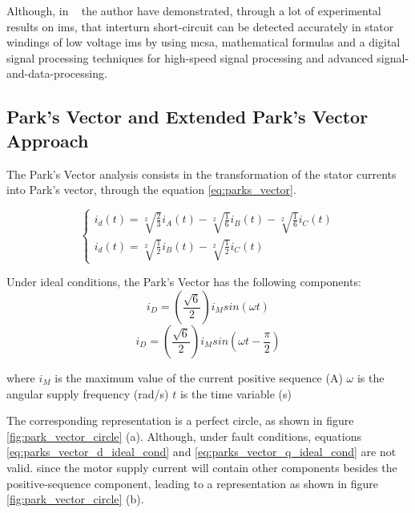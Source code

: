 Although, in ~\cite{Jung2006} the author have demonstrated, through a lot of experimental results on \acrshort{ims}, that interturn short-circuit can be detected accurately in stator windings of low voltage \acrshort{ims} by using \acrshort{mcsa}, mathematical formulas and a digital signal processing techniques for high-speed signal processing and advanced signal-and-data-processing.


\subsection{Park's Vector and Extended Park's Vector Approach} %
\label{subsec:epva}

The Park's Vector analysis consists in the transformation of the stator currents into Park's vector, through the equation \ref{eq:parks_vector}.

\begin{equation} \label{eq:parks_vector}
    \begin{cases}
	    i_{d}(t) =  \sqrt[2]{\frac{2}{3}} i_A(t) - \sqrt[2]{\frac{1}{6}} i_B(t) - \sqrt[2]{\frac{1}{6}} i_C(t) \\
	    i_{d}(t) =  \sqrt[2]{\frac{1}{2}} i_B(t) - \sqrt[2]{\frac{1}{2}} i_C(t) 
	\end{cases}
\end{equation}

 Under ideal conditions, the Park's Vector has the following components:
\begin{equation} \label{eq:parks_vector_d_ideal_cond}
    i_D = (\frac{\sqrt{6}}{2})i_M sin(\omega t)
\end{equation}
\begin{equation} \label{eq:parks_vector_q_ideal_cond}
    i_D = (\frac{\sqrt{6}}{2})i_M sin(\omega t - \frac{\pi}{2})
\end{equation}
 
where
    $i_M$ is the maximum value of the current positive sequence (A)
    $\omega$ is the angular supply frequency (rad/s)
    $t$ is the time variable (s)

The corresponding representation is a perfect circle, as shown in figure \ref{fig:park_vector_circle} (a).
Although, under fault conditions, equations \ref{eq:parks_vector_d_ideal_cond} and \ref{eq:parks_vector_q_ideal_cond} are not valid. since the motor supply current will contain other components besides the positive-sequence component, leading to a representation as shown in figure \ref{fig:park_vector_circle} (b).


